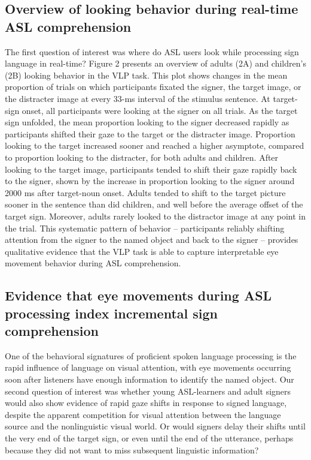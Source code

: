 \documentclass[oneside]{report}
\begin{document}
\subsection{Overview of looking behavior during real-time ASL
comprehension}\label{overview-of-looking-behavior-during-real-time-asl-comprehension}

The first question of interest was where do ASL users look while
processing sign language in real-time? Figure 2 presents an overview of
adults (2A) and children's (2B) looking behavior in the VLP task. This
plot shows changes in the mean proportion of trials on which
participants fixated the signer, the target image, or the distracter
image at every 33-ms interval of the stimulus sentence. At target-sign
onset, all participants were looking at the signer on all trials. As the
target sign unfolded, the mean proportion looking to the signer
decreased rapidly as participants shifted their gaze to the target or
the distracter image. Proportion looking to the target increased sooner
and reached a higher asymptote, compared to proportion looking to the
distracter, for both adults and children. After looking to the target
image, participants tended to shift their gaze rapidly back to the
signer, shown by the increase in proportion looking to the signer around
2000 ms after target-noun onset. Adults tended to shift to the target
picture sooner in the sentence than did children, and well before the
average offset of the target sign. Moreover, adults rarely looked to the
distractor image at any point in the trial. This systematic pattern of
behavior -- participants reliably shifting attention from the signer to
the named object and back to the signer -- provides qualitative evidence
that the VLP task is able to capture interpretable eye movement behavior
during ASL comprehension.

\subsection{Evidence that eye movements during ASL processing index
incremental sign
comprehension}\label{evidence-that-eye-movements-during-asl-processing-index-incremental-sign-comprehension}

One of the behavioral signatures of proficient spoken language
processing is the rapid influence of language on visual attention, with
eye movements occurring soon after listeners have enough information to
identify the named object. Our second question of interest was whether
young ASL-learners and adult signers would also show evidence of rapid
gaze shifts in response to signed language, despite the apparent
competition for visual attention between the language source and the
nonlinguistic visual world. Or would signers delay their shifts until
the very end of the target sign, or even until the end of the utterance,
perhaps because they did not want to miss subsequent linguistic
information?
\end{document}
